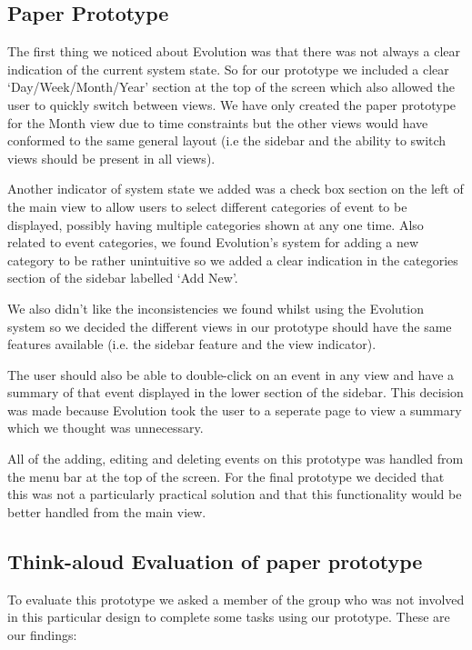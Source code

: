 \documentclass{article}
\begin{document}
\subsection{Paper Prototype}

The first thing we noticed about Evolution was that there was not
always a clear indication of the current system state. So for our
prototype we included a clear `Day/Week/Month/Year' section at the
top of the screen which also allowed the user to quickly switch between
views. We have only created the paper prototype for the Month view due
to time constraints but the other views would have conformed to the
same general layout (i.e the sidebar and the ability to switch views
should be present in all views).

Another indicator of system state we added was a check box section on
the left of the main view to allow users to select different categories
of event to be displayed, possibly having multiple categories shown at
any one time. Also related to event categories, we found Evolution's
system for adding a new category to be rather unintuitive so we added a
clear indication in the categories section of the sidebar labelled
`Add New'.

We also didn't like the inconsistencies we found whilst using the
Evolution system so we decided the different views in our prototype
should have the same features available (i.e. the sidebar feature and
the view indicator).

The user should also be able to double-click on an event in any view and
have a summary of that event displayed in the lower section of the
sidebar. This decision was made because Evolution took the user to a
seperate page to view a summary which we thought was unnecessary.

All of the adding, editing and deleting events on this prototype was 
handled from the menu bar at the top of the screen. For the final
prototype we decided that this was not a particularly practical solution
and that this functionality would be better handled from the main view.

\subsection{Think-aloud Evaluation of paper prototype}

To evaluate this prototype we asked a member of the group who was not
involved in this particular design to complete some tasks using our
prototype. These are our findings:
\end{document}
